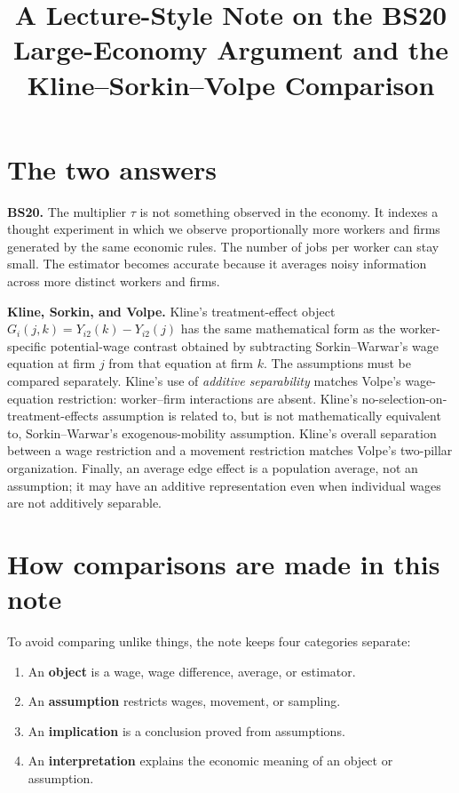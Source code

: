 \documentclass[11pt]{article}
\title{A Lecture-Style Note on the BS20 Large-Economy Argument and the
Kline--Sorkin--Volpe Comparison}
\author{}
\date{}
\begin{document}
\maketitle

\section*{The two answers}

\textbf{BS20.}
The multiplier \(\tau\) is not something observed in the economy.  It
indexes a thought experiment in which we observe proportionally more
workers and firms generated by the same economic rules.  The number of jobs
per worker can stay small.  The estimator becomes accurate because it
averages noisy information across more distinct workers and firms.

\textbf{Kline, Sorkin, and Volpe.}
Kline's treatment-effect object
\(G_i(j,k)=Y_{i2}(k)-Y_{i2}(j)\) has the same mathematical form as the
worker-specific potential-wage contrast obtained by subtracting
Sorkin--Warwar's wage equation at firm \(j\) from that equation at firm
\(k\).  The assumptions must be compared separately.  Kline's use of
\emph{additive separability} matches
Volpe's wage-equation restriction: worker--firm interactions are absent.
Kline's no-selection-on-treatment-effects assumption is related to, but is
not mathematically equivalent to, Sorkin--Warwar's exogenous-mobility
assumption.  Kline's overall separation between a wage restriction and a
movement restriction matches Volpe's two-pillar organization.  Finally, an
average edge effect is a population average, not an assumption; it may have
an additive representation even when individual wages are not additively
separable.

\section*{How comparisons are made in this note}

To avoid comparing unlike things, the note keeps four categories separate:

\begin{enumerate}
\item An \textbf{object} is a wage, wage difference, average, or estimator.
\item An \textbf{assumption} restricts wages, movement, or sampling.
\item An \textbf{implication} is a conclusion proved from assumptions.
\item An \textbf{interpretation} explains the economic meaning of an object
or assumption.
\end{enumerate}
\end{document}
